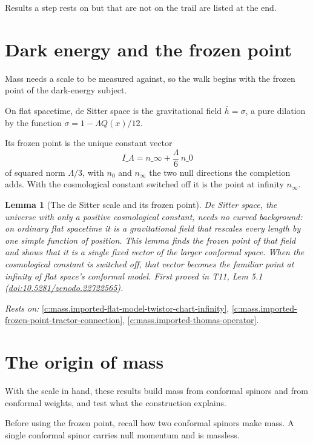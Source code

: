 \documentclass[11pt]{article}
\newtheorem{lemma}[theorem]{Lemma}
\theoremstyle{definition}
\theoremstyle{plain}
\providecommand{\hb}{}\renewcommand{\hb}{\bar{h}}
\begin{document}
Results a step rests on but that are not on the trail are listed at the end.

\section{Dark energy and the frozen point}

Mass needs a scale to be measured against, so the walk begins with the frozen point of the dark-energy subject.

On flat spacetime, de Sitter space is the gravitational field $\hb = \sigma$, a pure dilation by the function $\sigma = 1 - \Lambda Q(x)/12$.

Its frozen point is the unique constant vector \[ I\_\Lambda = n\_\infty + \frac{\Lambda}{6}\,n\_0 \] of squared norm $\Lambda/3$, with $n_0$ and $n_\infty$ the two null directions the completion adds. With the cosmological constant switched off it is the point at infinity $n_\infty$.

\begin{lemma}[The de Sitter scale and its frozen point]\label{c:mass.de-sitter-scale-frozen-point}
De Sitter space, the universe with only a positive cosmological constant, needs no curved background: on ordinary flat spacetime it is a gravitational field that rescales every length by one simple function of position. This lemma finds the frozen point of that field and shows that it is a single fixed vector of the larger conformal space. When the cosmological constant is switched off, that vector becomes the familiar point at infinity of flat space's conformal model.
\emph{First proved in} T11, Lem 5.1 (\href{https://doi.org/10.5281/zenodo.22722565}{doi:10.5281/zenodo.22722565}).
\end{lemma}
\noindent\emph{Rests on:} \ref{c:mass.imported-flat-model-twistor-chart-infinity}, \ref{c:mass.imported-frozen-point-tractor-connection}, \ref{c:mass.imported-thomas-operator}.

\section{The origin of mass}

With the scale in hand, these results build mass from conformal spinors and from conformal weights, and test what the construction explains.

Before using the frozen point, recall how two conformal spinors make mass. A single conformal spinor carries null momentum and is massless.
\end{document}
